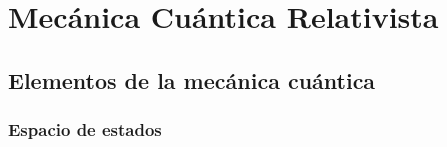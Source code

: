 \chapter{Mecánica Cuántica Relativista}\label{cap.2}


\section{Elementos de la mecánica cuántica} \renewcommand{\thefootnote}{\arabic{footnote}} %
\subsection{Espacio de estados}
